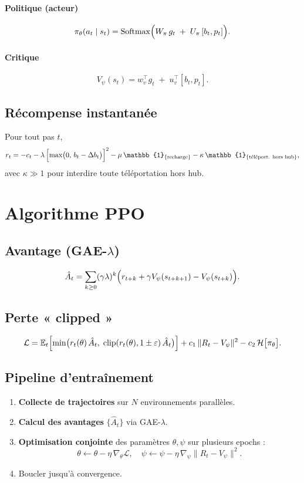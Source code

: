 \documentclass[11pt,a4paper]{article}
\newcommand{\E}{\mathbb{E}}
\begin{document}
\paragraph{Politique (acteur)}  
\[
  \pi_\theta(a_t\mid s_t)
  = \mathrm{Softmax}\Bigl(W_\pi\,g_t\;+\;U_\pi\,[b_t,p_t]\Bigr).
\]
\paragraph{Critique}  
\[
  V_\psi(s_t)
  = w_v^\top g_t \;+\; u_v^\top [b_t,p_t].
\]

\subsection{Récompense instantanée}
Pour tout pas \(t\),
\[
  r_t
  = -c_t
  - \lambda\,\Bigl[\max\bigl(0,\,b_t - \Delta b_t\bigr)\Bigr]^2
  - \mu\,\mathbb{1}_{\{\text{recharge}\}}
  - \kappa\,\mathbb{1}_{\{\text{téléport. hors hub}\}},
\]
avec \(\kappa\gg1\) pour interdire toute téléportation hors hub.

\section{Algorithme PPO}
\subsection{Avantage (GAE-\(\lambda\))}
\[
  \hat{A}_t 
  = \sum_{k\ge0}(\gamma\lambda)^k
    \Bigl(r_{t+k} 
    + \gamma V_\psi(s_{t+k+1})
    - V_\psi(s_{t+k})\Bigr).
\]
\subsection{Perte « clipped »}
\[
  \mathcal{L}
  = \E_t\Bigl[
      \min\bigl(r_t(\theta)\,\hat{A}_t,\;
                 \mathrm{clip}(r_t(\theta),1\pm\varepsilon)\,\hat{A}_t
           \bigr)
    \Bigr]
  + c_1\,\|R_t - V_\psi\|^2
  - c_2\,\mathcal{H}\bigl[\pi_\theta\bigr].
\]

\subsection{Pipeline d'entraînement}
\begin{enumerate}
  \item \textbf{Collecte de trajectoires} sur \(N\) environnements parallèles.
  \item \textbf{Calcul des avantages} \(\{\hat{A}_t\}\) via GAE-\(\lambda\).
  \item \textbf{Optimisation conjointe} des paramètres \(\theta,\psi\) sur plusieurs epochs :
    \[
      \theta\leftarrow\theta-\eta\,\nabla_\theta\mathcal{L},\quad
      \psi\leftarrow\psi-\eta\,\nabla_\psi\bigl\|R_t - V_\psi\bigr\|^2.
    \]
  \item Boucler jusqu'à convergence.
\end{enumerate}
\end{document}
